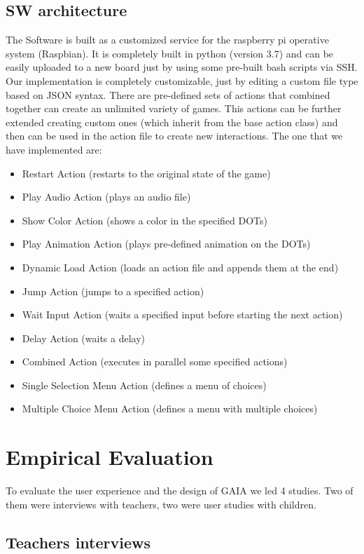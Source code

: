 \documentclass[a4paper,11pt]{report}
\begin{document}
\section{SW architecture}
The Software is built as a customized service for the raspberry pi operative system (Raspbian).
It is completely built in python (version 3.7) and can be easily uploaded to a new board just by using some pre-built bash scripts via SSH.
Our implementation is completely customizable, just by editing a custom file type based on JSON syntax. 
There are pre-defined sets of actions that combined together can create an unlimited variety of games. This actions can be further extended creating custom ones (which inherit from the base action class) and then can be used in the action file to create new interactions.
The one that we have implemented are:
\begin{itemize}
    \item Restart Action (restarts to the original state of the game)
    \item Play Audio Action (plays an audio file)
    \item Show Color Action (shows a color in the specified DOTs)
    \item Play Animation Action (plays pre-defined animation on the DOTs)
    \item Dynamic Load Action (loads an action file and appends them at the end)
    \item Jump Action (jumps to a specified action)
    \item Wait Input Action (waits a specified input before starting the next action)
    \item Delay Action (waits a delay)
    \item Combined Action (executes in parallel some specified actions)
    \item Single Selection Menu Action (defines a menu of choices)
    \item Multiple Choice Menu Action (defines a menu with multiple choices) 
\end{itemize}

\chapter{Empirical Evaluation}
To evaluate the user experience and the design of GAIA we led 4 studies. Two of them were interviews with teachers, two were user studies with children.
\section{Teachers interviews}
\end{document}
